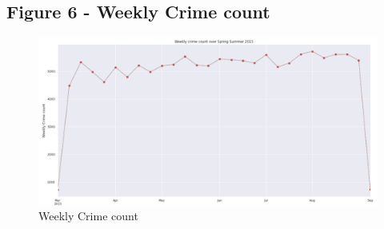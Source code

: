 \documentclass[a4paper, twocolumn]{article}
\begin{document}
\subsection{Figure 6 - Weekly Crime count}\label{appendix:fig4}
\begin{figure}[h]
\includegraphics[width=\textwidth]{fig4.png}
\caption{Weekly Crime count}
\end{figure}

\newpage
\printbibliography
\end{document}
